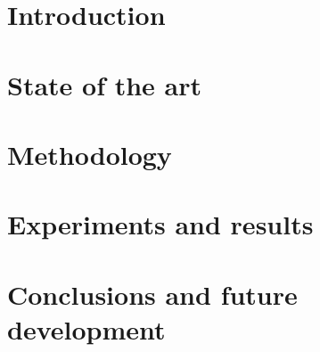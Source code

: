 \documentclass[a4paper,12pt,titlepage]{article}
\begin{document}
\newpage
{}

\section{Introduction}


\section{State of the art}


\section{Methodology}


\section{Experiments and results}


\section{Conclusions and future development}


\printbibliography
\end{document}
